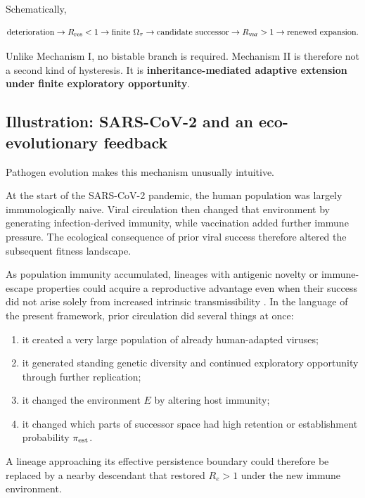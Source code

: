 \documentclass[11pt,a4paper]{article}
\providecommand{\tightlist}{%
  \setlength{\itemsep}{0pt}\setlength{\parskip}{0pt}}
\begin{document}
Schematically,

\[
\text{deterioration}
\rightarrow
R_{\rm res}<1
\rightarrow
\text{finite }\Omega_\tau
\rightarrow
\text{candidate successor}
\rightarrow
R_{\rm var}>1
\rightarrow
\text{renewed expansion}.
\]

Unlike Mechanism I, no bistable branch is required. Mechanism II is
therefore not a second kind of hysteresis. It is
\textbf{inheritance-mediated adaptive extension under finite exploratory
opportunity}.

\subsection{Illustration: SARS-CoV-2 and an eco-evolutionary
feedback}\label{illustration-sars-cov-2-and-an-eco-evolutionary-feedback}

Pathogen evolution makes this mechanism unusually intuitive.

At the start of the SARS-CoV-2 pandemic, the human population was
largely immunologically naive. Viral circulation then changed that
environment by generating infection-derived immunity, while vaccination
added further immune pressure. The ecological consequence of prior viral
success therefore altered the subsequent fitness landscape.

As population immunity accumulated, lineages with antigenic novelty or
immune-escape properties could acquire a reproductive advantage even
when their success did not arise solely from increased intrinsic
transmissibility \citep{Carabelli2023}. In the language of the present
framework, prior circulation did several things at once:

\begin{enumerate}
\def\labelenumi{\arabic{enumi}.}
\tightlist
\item
  it created a very large population of already human-adapted viruses;
\item
  it generated standing genetic diversity and continued exploratory
  opportunity through further replication;
\item
  it changed the environment \(E\) by altering host immunity;
\item
  it changed which parts of successor space had high retention or
  establishment probability \(\pi_{\rm est}\).
\end{enumerate}

A lineage approaching its effective persistence boundary could therefore
be replaced by a nearby descendant that restored \(R_e>1\) under the new
immune environment.
\end{document}
